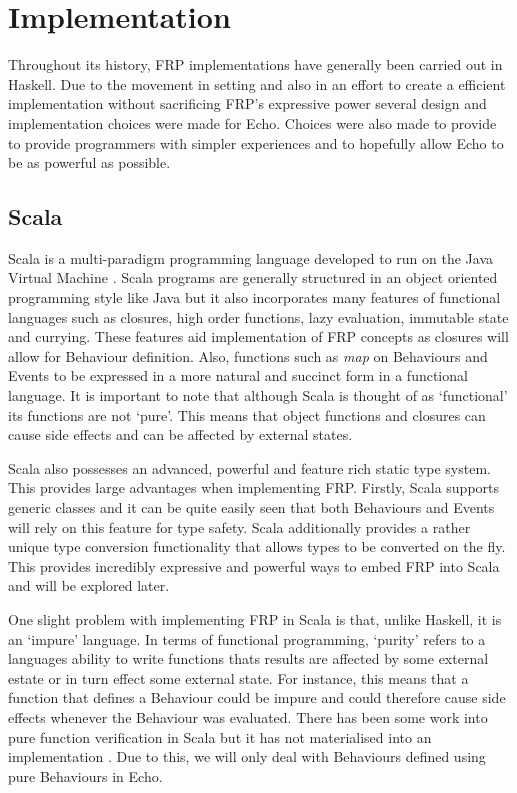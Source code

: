 \chapter{Implementation}
  Throughout its history, FRP implementations have generally been carried out in Haskell. Due to the movement
  in setting and also in an effort to create a efficient implementation without sacrificing FRP's expressive power
  several design and implementation choices were made for Echo. Choices were also made
  to provide to provide programmers with simpler experiences and to hopefully allow Echo to be
  as powerful as possible.
  
  \section{Scala}
    Scala is a multi-paradigm programming language developed to run on the Java Virtual Machine \cite{Odersky2004}. Scala 
    programs are
    generally structured in an object oriented programming style like Java but it also incorporates many features of
    functional languages such as closures, high order functions, lazy evaluation, immutable state and currying. These 
    features 
    aid
    implementation of FRP concepts as closures will allow for Behaviour definition. Also, functions such as \emph{map} on
    Behaviours and Events to be expressed in a more natural and succinct form in a functional language. It is
    important to note that although Scala is thought of as `functional' its functions are not `pure'. This means
    that object functions and closures can cause side effects and can be affected by external states.

    Scala also possesses an advanced, powerful and feature rich static type system. This provides large
    advantages when implementing FRP. Firstly, Scala supports generic classes and it can be quite easily seen
    that both Behaviours and Events will rely on this feature for type safety. Scala additionally provides
    a rather unique type conversion functionality that allows types to be converted on the fly. This provides
    incredibly expressive and powerful ways to embed FRP into Scala and will be explored later.
    
    One slight problem with implementing FRP in Scala is that, unlike Haskell, it is an `impure'
    language. In terms of functional programming, `purity' refers to a languages ability to write functions
    thats results are affected by some external estate or in turn effect some external state. For instance,
    this means that a function that defines a Behaviour could be impure and could therefore cause side effects
    whenever the Behaviour was evaluated. There has been some work into pure function verification in Scala but it has not materialised into an  
    implementation \cite{Nordenberg}. Due to this, we will only deal with Behaviours defined using pure Behaviours in Echo.

